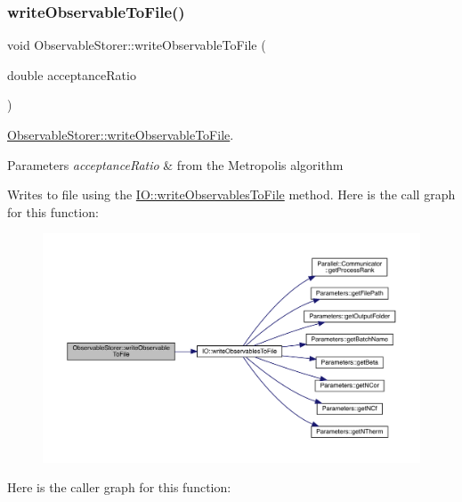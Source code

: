 \subsubsection{\texorpdfstring{writeObservableToFile()}{writeObservableToFile()}}
{\footnotesize\ttfamily void Observable\+Storer\+::write\+Observable\+To\+File (\begin{DoxyParamCaption}\item[{double}]{acceptance\+Ratio }\end{DoxyParamCaption})}



\mbox{\hyperlink{class_observable_storer_a146f9acb8a0a2ce15782d26bdc4f0bf9}{Observable\+Storer\+::write\+Observable\+To\+File}}. 


\begin{DoxyParams}{Parameters}
{\em acceptance\+Ratio} & from the Metropolis algorithm\\
\hline
\end{DoxyParams}
Writes to file using the \mbox{\hyperlink{namespace_i_o_ad8cf5aef8f60d10b80292b69a091d5ac}{I\+O\+::write\+Observables\+To\+File}} method. Here is the call graph for this function\+:
\nopagebreak
\begin{figure}[H]
\begin{center}
\leavevmode
\includegraphics[width=350pt]{class_observable_storer_a146f9acb8a0a2ce15782d26bdc4f0bf9_cgraph}
\end{center}
\end{figure}
Here is the caller graph for this function\+:
\nopagebreak
